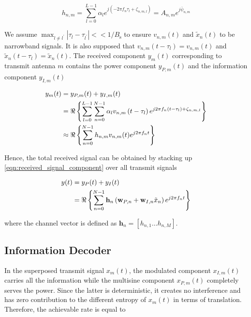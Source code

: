 \begin{equation}\label{eqn:channel}
  {h_{n,m}} = \sum\limits_{l = 0}^{L - 1} {{\alpha _l}{e^{j\left( { - 2\pi {f_n}{\tau _l} + {\zeta _{n,m,l}}} \right)}}}  = {A_{n,m}}{e^{j{{\bar \psi }_{n,m}}}}
\end{equation}

We assume ${\max _{l \ne {l^\prime }}}\left| {{\tau _l} - {\tau _{{l^\prime }}}} \right| <  < 1/{B_{\text{s}}}$ to ensure $v_{n, m}(t)$ and $\tilde{x}_{n}(t)$ to be narrowband signals. It is also supposed that ${v_{n,m}}\left( {t - {\tau _l}} \right) = {v_{n,m}}(t)$ and ${{\tilde x}_n}\left( {t - {\tau _l}} \right) = {{\tilde x}_n}(t)$. The received component ${y_m}(t)$ corresponding to transmit antenna $m$ contains the power component $y_{P, m}(t)$ and the information component $y_{I, m}(t)$

\begin{align}\label{eqn:received_signal_component}
  {y_m}(t) &= {y_{P,m}}(t) + {y_{I,m}}(t) \hfill \\
   &= \Re \left\{ {\sum\limits_{l = 0}^{L - 1} {\sum\limits_{n = 0}^{N - 1} {{\alpha _l}} } {v_{n,m}}\left( {t - {\tau _l}} \right){e^{j2\pi {f_n}\left( {t - {\tau _l}} \right) + {\zeta _{n,m,l}}}}} \right\} \hfill \\
   &\approx \Re \left\{ {\sum\limits_{n = 0}^{N - 1} {{h_{n,m}}} {v_{n,m}}(t){e^{j2\pi {f_n}t}}} \right\} \hfill
\end{align}

Hence, the total received signal can be obtained by stacking up \eqref{eqn:received_signal_component} over all transmit signals

\begin{align}\label{eqn:received_signal}
  y(t) &= {y_P}(t) + {y_I}(t) \hfill \\
   &= \Re \left\{ {\sum\limits_{n = 0}^{N - 1} {{{\mathbf{h}}_n}} \left( {{{\mathbf{w}}_{P,n}} + {{\mathbf{w}}_{I,n}}{{\tilde x}_n}} \right){e^{j2\pi {f_n}t}}} \right\} \hfill
\end{align}

where the channel vector is defined as ${{\mathbf{h}}_n} = \left[ {{h_{n,1}} \ldots {h_{n,M}}} \right]$.



\subsection{Information Decoder}\label{sec:information-decoder}
In the superposed transmit signal ${x_m}(t)$, the modulated component ${x_{I,m}}(t)$ carries all the information while the multisine component ${x_{P,m}}(t)$ completely serves the power. Since the latter is deterministic, it creates no interference and has zero contribution to the different entropy of ${x_m}(t)$ in terms of translation. Therefore, the achievable rate is equal to

